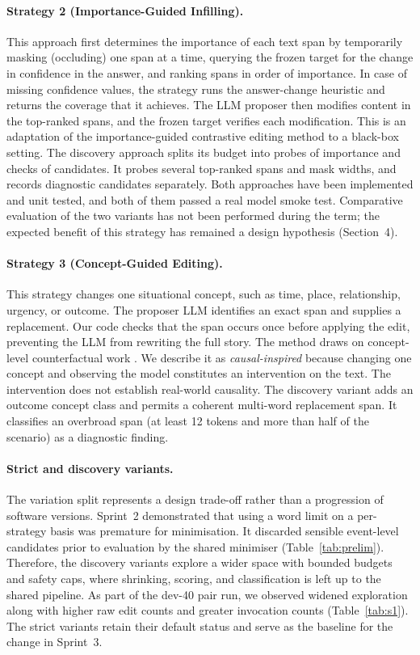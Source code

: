 \documentclass[11pt,a4paper]{article}
\newcommand{\strattwo}{Strategy 2 (Importance-Guided Infilling)}
\newcommand{\stratthree}{Strategy 3 (Concept-Guided Editing)}
\begin{document}
\paragraph{\strattwo{}.}
This approach first determines the importance of each text span by temporarily
masking (occluding) one span at a time, querying the frozen target for the change in confidence in
the answer, and ranking spans in order of importance. In case of missing confidence
values, the strategy runs the answer-change heuristic and returns the coverage that
it achieves. The LLM proposer then modifies content in the top-ranked spans, and
the frozen target verifies each modification. This is an adaptation of the importance-guided
contrastive editing method \cite{ross2021} to a black-box setting. The discovery
approach splits its budget into probes of importance and checks of candidates.
It probes several top-ranked spans and mask widths, and records diagnostic
candidates separately. Both approaches have been implemented and unit tested, and both
of them passed a real model smoke test. Comparative evaluation of the two variants
has not been performed during the term; the expected benefit of this strategy
has remained a design hypothesis (Section~4).

\paragraph{\stratthree{}.}
This strategy changes one situational concept, such as time, place, relationship,
urgency, or outcome. The proposer LLM identifies an exact span and supplies a
replacement. Our code checks that the span occurs once before applying the edit,
preventing the LLM from rewriting the full story. The method draws on concept-level
counterfactual work \cite{gat2024}. We describe it as \emph{causal-inspired} because
changing one concept and observing the model constitutes an intervention on the
text. The intervention does not establish real-world causality. The discovery
variant adds an outcome concept class and permits a coherent multi-word replacement
span. It classifies an overbroad span (at least 12 tokens and more than half of the
scenario) as a diagnostic finding.

\paragraph{Strict and discovery variants.}
The variation split represents a design trade-off rather than a progression of
software versions. Sprint~2 demonstrated that using a word limit on a per-strategy
basis was premature for minimisation. It discarded sensible event-level
candidates prior to evaluation by the shared minimiser (Table~\ref{tab:prelim}).
Therefore, the discovery variants explore a wider space with bounded budgets and
safety caps, where shrinking, scoring, and classification is left up to the shared
pipeline. As part of the dev-40 pair run, we observed widened exploration along
with higher raw edit counts and greater invocation counts
(Table~\ref{tab:s1}). The strict variants retain their default status and serve as
the baseline for the change in Sprint~3.
\end{document}
